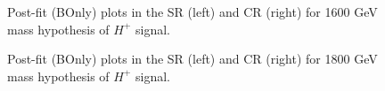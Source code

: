 \begin{figure}[H]
  \centering
  \caption{Post-fit (BOnly) plots in the SR (left) and CR (right) for 1600 GeV mass hypothesis of $H^{+}$ signal.}
  \label{fig:Postfit_Hp1600_Blind}
\end{figure}
\begin{figure}[H]
  \centering
  \caption{Post-fit (BOnly) plots in the SR (left) and CR (right) for 1800 GeV mass hypothesis of $H^{+}$ signal.}
  \label{fig:Postfit_Hp1800_Blind}
\end{figure}
